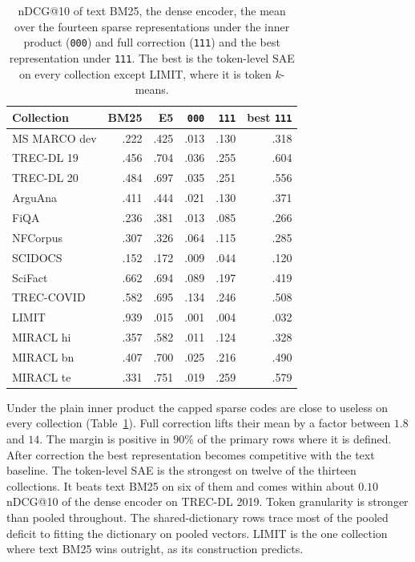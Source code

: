 \documentclass[11pt]{article}
\begin{document}
\begin{table}[t]
\centering
\small
\setlength{\tabcolsep}{4pt}
\begin{tabular}{@{}lrrrrr@{}}
\toprule
Collection & BM25 & E5 & \texttt{000} & \texttt{111} & best \texttt{111} \\
\midrule
MS MARCO dev & .222 & .425 & .013 & .130 & .318 \\
TREC-DL 19 & .456 & .704 & .036 & .255 & .604 \\
TREC-DL 20 & .484 & .697 & .035 & .251 & .556 \\
ArguAna & .411 & .444 & .021 & .130 & .371 \\
FiQA & .236 & .381 & .013 & .085 & .266 \\
NFCorpus & .307 & .326 & .064 & .115 & .285 \\
SCIDOCS & .152 & .172 & .009 & .044 & .120 \\
SciFact & .662 & .694 & .089 & .197 & .419 \\
TREC-COVID & .582 & .695 & .134 & .246 & .508 \\
LIMIT & .939 & .015 & .001 & .004 & .032 \\
MIRACL hi & .357 & .582 & .011 & .124 & .328 \\
MIRACL bn & .407 & .700 & .025 & .216 & .490 \\
MIRACL te & .331 & .751 & .019 & .259 & .579 \\
\bottomrule
\end{tabular}
\caption{nDCG@10 of text BM25, the dense encoder, the mean over the fourteen sparse
representations under the inner product (\texttt{000}) and full correction
(\texttt{111}) and the best representation under \texttt{111}. The best is the
token-level SAE on every collection except LIMIT, where it is token $k$-means.}
\label{tab:quality}
\end{table}

Under the plain inner product the capped sparse codes are close to useless on every
collection (Table~\ref{tab:quality}). Full correction lifts their mean by a factor between
$1.8$ and $14$. The margin is positive in $90\%$ of the primary rows where it is defined.
After correction the best representation becomes competitive with the text baseline. The
token-level SAE is the strongest on twelve of the thirteen collections. It beats text BM25
on six of them and comes within about $0.10$ nDCG@10 of the dense encoder on TREC-DL 2019. Token
granularity is stronger than pooled throughout. The shared-dictionary rows trace most of
the pooled deficit to fitting the dictionary on pooled vectors. LIMIT is the one collection
where text BM25 wins outright, as its construction predicts.
\end{document}
